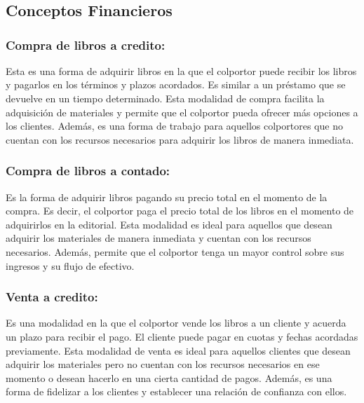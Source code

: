 \documentclass[runningheads]{llncs}
\begin{document}
    \section{}
    \section{}

        \subsection{Conceptos Financieros}
            \subsubsection{Compra de libros a credito: }Esta es una forma de adquirir libros en la que el colportor puede recibir los libros y pagarlos en los términos y plazos acordados. Es similar a un préstamo que se devuelve en un tiempo determinado. Esta modalidad de compra facilita la adquisición de materiales y permite que el colportor pueda ofrecer más opciones a los clientes. Además, es una forma de trabajo para aquellos colportores que no cuentan con los recursos necesarios para adquirir los libros de manera inmediata.

            \subsubsection{Compra de libros a contado: }Es la forma de adquirir libros pagando su precio total en el momento de la compra. Es decir, el colportor paga el precio total de los libros en el momento de adquirirlos en la editorial. Esta modalidad es ideal para aquellos que desean adquirir los materiales de manera inmediata y cuentan con los recursos necesarios. Además, permite que el colportor tenga un mayor control sobre sus ingresos y su flujo de efectivo.

            \subsubsection{Venta a credito: }Es una modalidad en la que el colportor vende los libros a un cliente y acuerda un plazo para recibir el pago. El cliente puede pagar en cuotas y fechas acordadas previamente. Esta modalidad de venta es ideal para aquellos clientes que desean adquirir los materiales pero no cuentan con los recursos necesarios en ese momento o desean hacerlo en una cierta cantidad de pagos. Además, es una forma de fidelizar a los clientes y establecer una relación de confianza con ellos.
\end{document}
